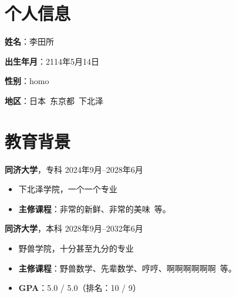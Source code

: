 \documentclass[11pt]{article}
\newlength{\iconwidth}
\begin{document}
    \begin{minipage}[t]{0.78\textwidth}
        \begin{minipage}[t]{\textwidth}
        \section[个人信息]{\quad 个人信息}
        \begin{minipage}[t]{0.5\textwidth}
            \textbf{姓\qquad 名}：李田所
            
            \vspace{0.5em}
            \textbf{出生年月}：2114年5月14日
        \end{minipage}
        \begin{minipage}[t]{0.35\textwidth}
            \textbf{性\qquad 别}：homo
            
            \vspace{0.5em}
            \textbf{地\qquad 区}：日本\ 东京都\ 下北泽
        \end{minipage}
        \vspace{1.2em}
        \end{minipage}

        \begin{minipage}[t]{\textwidth}
        \section[教育背景]{\quad 教育背景}
        
        {\large \textbf{同济大学}}，专科 \hfill 2024年9月--2028年6月
        \begin{itemize}
            \item 下北泽学院，一个一个专业
            \item \textbf{主修课程}：非常的新鲜、非常的美味\ 等。
        \end{itemize}
        
        \vspace{0.5em}
        {\large \textbf{同济大学}}，本科 \hfill 2028年9月--2032年6月
        \begin{itemize}
            \item 野兽学院，十分甚至九分的专业
            \item \textbf{主修课程}：野兽数学、先辈数学、哼哼、啊啊啊啊啊啊\ 等。
            \item \textbf{GPA}：5.0 / 5.0（排名：10 / 9）
        \end{itemize}
        

\end{minipage}
\end{minipage}
\end{document}
